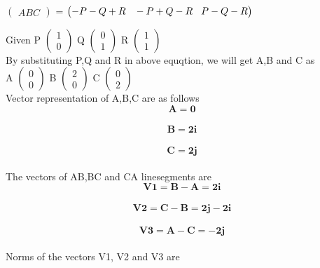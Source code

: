 \documentclass[10pt,a4paper]{report}
\let\vec\mathbf
\begin{document}
\begin{multicols}{2}
\begin{center}
$ \begin{pmatrix} 
A
B
C
\end{pmatrix} $ =
$ \begin{pmatrix} 
-P-Q+R \hspace{3mm}
-P+Q-R\hspace{3mm}
P-Q-R
\end{pmatrix} $ 
\end{center}
Given P  $ \begin{pmatrix}
  1 \\
  0
 \end{pmatrix} $ \hspace{3mm}
     Q  $ \begin{pmatrix}
  0 \\
  1
  \end{pmatrix} $ \hspace{3mm}
     R  $ \begin{pmatrix}
  1\\
  1
  \end{pmatrix} $ \\
By substituting P,Q and R in above equqtion, we will get A,B and C as \\
\vspace{2mm}
 A $ \begin{pmatrix} 
0 \\
0
\end{pmatrix} $  \hspace{2mm}
B $ \begin{pmatrix} 
2 \\
0
\end{pmatrix} $  \hspace{4mm}
C $ \begin{pmatrix}
0 \\
2
\end{pmatrix} $  \\ 
\vspace{2mm}
Vector representation of A,B,C are as follows
\begin{equation}
\vec{A=0}
\end{equation}\\
\begin{equation}
\vec{B=2i}
\end{equation}\\
\begin{equation}
\vec{C=2j}
\end{equation}\\
The vectors of AB,BC and CA linesegments are   \\
\begin{equation}
\vec{V1   = B-A=2i}
\end{equation}\\
\begin{equation}
\vec{V2 = C-B=2j-2i}
\end{equation}\\
\begin{equation}
\vec{V3 = A-C=-2j}
\end{equation} \\
Norms of the vectors V1, V2 and V3 are 


\end{multicols}
\end{document}
